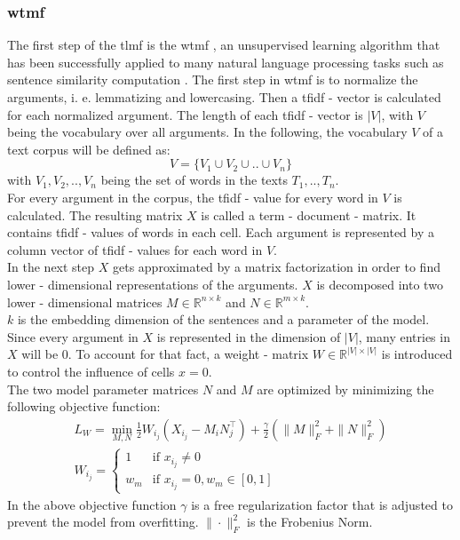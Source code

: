 \subsubsection{\acrfull{wtmf}}
The first step of the \acrshort{tlmf} is the \acrshort{wtmf} \cite{guo2012weiwei}, an unsupervised learning algorithm that has been successfully applied to many natural language processing tasks such as sentence similarity computation \cite{guo2012modeling}. 
The first step in \acrshort{wtmf} is to normalize the arguments, i. e. lemmatizing and lowercasing.
Then a \acrshort{tfidf} - vector is calculated for each normalized argument.
The length of each \acrshort{tfidf} - vector is $|V|$, with $V$ being the vocabulary over all arguments.
In the following, the vocabulary $V$ of a text corpus will be defined as:
    \begin{equation}
        V = \{V_1 \cup V_2 \cup .. \cup V_n\}    
    \end{equation}
with $V_1, V_2, .., V_n$ being the set of words in the texts $T_1, .., T_n$.\\
For every argument in the corpus, the \acrshort{tfidf} - value for every word in $V$ is calculated. 
The resulting matrix $X$ is called a term - document - matrix. It contains \acrshort{tfidf} - values of words in each cell. Each argument is represented by a column vector of \acrshort{tfidf} - values for each word in $V$.\\
In the next step $X$ gets approximated by a matrix factorization in order to find lower - dimensional representations of the arguments. $X$ is decomposed into two lower - dimensional matrices $M \in \mathbb{R}^{n \times k}$ and $N \in \mathbb{R}^{m \times k}$.\\ $k$ is the embedding dimension of the sentences and a parameter of the model.
Since every argument in $X$ is represented in the dimension of $|V|$, many entries in $X$ will be $0$. To account for that fact, a weight - matrix $W  \in \mathbb{R}^{|V| \times |V|}$ 
is introduced to control the influence of cells $x = 0$.\\
The two model parameter matrices $N$ and $M$ are optimized by minimizing the following objective function:
\begin{equation}
\begin{align*}
    L_W = \min_{M,N} \frac{1}{2} W_i_j (X_i_j - M_iN_j^\top) + \frac{\gamma}{2}(\|M\|^2_F + \|N\|^2_F) \\
    W_i_j = \left\{
	\begin{array}{ll}
		1  & \mbox{if } x_i_j \neq 0 \\
		w_m & \mbox{if } x_i_j = 0, w_m \in [0,1]
	\end{array}
\right.
\end{align*}
\end{equation}
In the above objective function $\gamma$ is a free regularization factor that is adjusted to prevent the model from overfitting. $\|\cdot\|^2_F$ is the Frobenius Norm.\\


